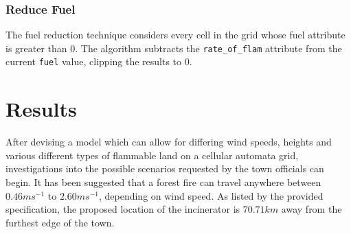 \documentclass[11pt, a4paper, titlepage]{article}
\newcommand{\code}[1]{\colorbox{light-gray}{\texttt{#1}}}
\begin{document}







\subsubsection{Reduce Fuel}
The fuel reduction technique considers every cell in the grid whose fuel attribute is greater than 0. The algorithm subtracts the \code{rate\_of\_flam} attribute from the current \code{fuel} value, clipping the results to 0. 


\section{Results}
After devising a model which can allow for differing wind speeds, heights and various different types of flammable land on a cellular automata grid, investigations into the possible scenarios requested by the town officials can begin. It has been suggested that a forest fire can travel anywhere between $0.46ms^{-1}$ \cite{viegas2009recent} to $2.60ms^{-1}$, depending on wind speed. As listed by the provided specification, the proposed location of the incinerator is $70.71km$ away from the furthest edge of the town. 
\end{document}
